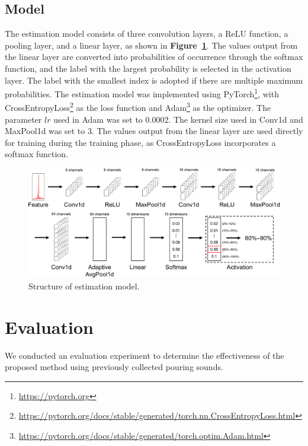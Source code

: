 \documentclass[sigconf,authordraft]{acmart}
\newcommand\figref[1]{\textbf{Figure~\ref{fig:#1}}}
\begin{document}
\subsection{Model}
The estimation model consists of three convolution layers, a ReLU function, a pooling layer, and a linear layer, as shown in \figref{model}. The values output from the linear layer are converted into probabilities of occurrence through the softmax function, and the label with the largest probability is selected in the activation layer. The label with the smallest index is adopted if there are multiple maximum probabilities. The estimation model was implemented using PyTorch\footnote{\url{https://pytorch.org}}, with CrossEntropyLoss\footnote{\url{https://pytorch.org/docs/stable/generated/torch.nn.CrossEntropyLoss.html}} as the loss function and Adam\footnote{\url{https://pytorch.org/docs/stable/generated/torch.optim.Adam.html}} as the optimizer. The parameter $lr$ used in Adam was set to 0.0002. The kernel size used in Conv1d and MaxPool1d was set to 3. The values output from the linear layer are used directly for training during the training phase, as CrossEntropyLoss incorporates a softmax function.

\begin{figure}[!t]
  \centering
  \includegraphics[width=0.8\linewidth]{figures/model.eps}
  \caption{Structure of estimation model.}
  \label{fig:model}
\end{figure}



\section{Evaluation}
\label{sec:evaluation}
We conducted an evaluation experiment to determine the effectiveness of the proposed method using previously collected pouring sounds.

\end{document}
